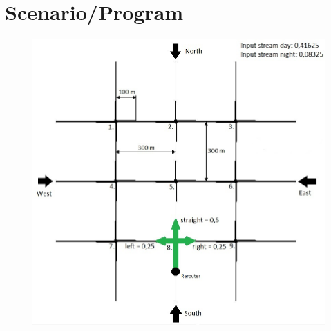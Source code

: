 \documentclass{beamer}
\begin{document}
%		
%	
%

	\section{Scenario/Program}
	\frame{\tableofcontents[currentsection]}
	
	\begin{frame}
		
		
		\begin{figure}[H]
			\centering
			\includegraphics[width=0.7\linewidth]{3x3_inf}
			\label{fig:3x3inf}
		\end{figure}
	\end{frame}
	
\end{document}
